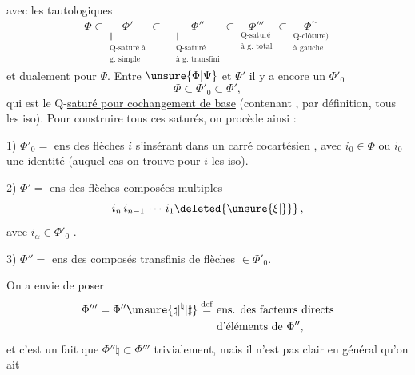 
avec les 
tautologiques
\[
\begin{aligned}
\Phi\subset
\underset{\substack{\Vert\\\text{Q-saturé à}\\\text{g. simple}}}{\Phi'}
\subset{}&
\underset{\substack{\Vert\\\text{Q-saturé}\\\text{à g. transfini}}}{\Phi''}
\subset
\underset{\substack{\text{Q-saturé}\\\text{à g. total}}}{\Phi'''}
\subset
\underset{\substack{\text{Q-clôture)}\\\text{à gauche}}}{\Phi^{\sim}}
\end{aligned}\tag*{(1.7)}
\]
et dualement pour $\Psi$. Entre $\unsure{\Phi|\Psi}$ et $\Psi'$
il y a encore un $\Phi'_0$
\[
 \Phi\subset\Phi'_0\subset\Phi',\tag*{(1.8)}
\]
qui est le Q-\uline{saturé pour cochangement de base} (contenant
, par définition, tous les iso). Pour construire
tous ces saturés, on procède ainsi :

1) $\Phi'_0=$ ens des flèches $i$
s'insérant dans un carré cocartésien
,
avec $i_0\in\Phi$  ou $i_0$ une identité
(auquel cas on trouve pour $i$ les iso).

2) $\Phi'=$ ens des flèches composées multiples
\[
 i_n\,i_{n-1}\,\cdots\,i_1\deleted{\unsure{\xi|\}}}\,,
\]
avec $i_\alpha\in\Phi'_0$ \deleted{\unsure{$\xi$}}.

3) $\Phi''=$ ens des composés transfinis de flèches $\in\Phi'_0$.

 On a envie de poser
\[
 \begin{aligned}
 \Phi'''=\Phi''\unsure{\natural|{}^{\natural}|\sharp}\overset{\mathrm{def}}{=}
 &\ \text{ens. des facteurs directs}\\
 &\ \text{d'éléments de }\Phi'',
 \end{aligned}
\]
et c'est un fait que $\Phi''\natural\subset\Phi'''$ trivialement, mais
il n'est pas clair en général qu'on ait
